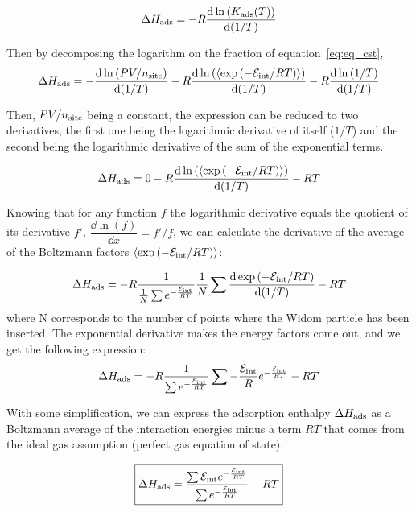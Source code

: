 \documentclass[main.tex]{subfiles}
\begin{document}
\begin{equation}
  \Delta H_{\text{ads}} = -R\dfrac{\mathop{}\mathopen{}\mathrm{d} \ln\left(K_{\text{ads}}(T)\right)}{\mathop{}\mathopen{}\mathrm{d} (1/T)}
\end{equation}

Then by decomposing the logarithm on the fraction of equation~\ref{eq:eq_cst}, 
\begin{equation}
  \Delta H_{\text{ads}} = -\dfrac{\mathop{}\mathopen{}\mathrm{d} \ln\left(PV/n_{\text{site}}\right)}{\mathop{}\mathopen{}\mathrm{d} (1/T)} - R\dfrac{\mathop{}\mathopen{}\mathrm{d} \ln\left(\langle \exp\left(-\mathcal{E}_{\text{int}}/RT\right) \rangle\right)}{\mathop{}\mathopen{}\mathrm{d} (1/T)} - R\dfrac{\mathop{}\mathopen{}\mathrm{d} \ln\left(1/T\right)}{\mathop{}\mathopen{}\mathrm{d} (1/T)}
\end{equation}

Then, $PV/n_{\text{site}}$ being a constant, the expression can be reduced to two derivatives, the first one being the logarithmic derivative of itself ($1/T$) and the second being the logarithmic derivative of the sum of the exponential terms. 

\begin{equation}
  \Delta H_{\text{ads}} = 0 - R\dfrac{\mathop{}\mathopen{}\mathrm{d} \ln\left(\langle \exp\left(-\mathcal{E}_{\text{int}}/RT\right) \rangle\right)}{\mathop{}\mathopen{}\mathrm{d} (1/T)} - RT
\end{equation}

Knowing that for any function $f$ the logarithmic derivative equals the quotient of its derivative $f'$, $\dfrac{\dd \ln\left(f\right)}{\dd x}=f'/f$, we can calculate the derivative of the average of the Boltzmann factors $\langle \exp\left(-\mathcal{E}_{\text{int}}/RT\right) \rangle$:

\begin{equation}
  \Delta H_{\text{ads}} = -R\dfrac{1}{\frac{1}{N}\sum e^{-\frac{\mathcal{E}_{\text{int}}}{RT}}} \frac{1}{N}\sum \dfrac{\mathop{}\mathopen{}\mathrm{d} \exp\left(-\mathcal{E}_{\text{int}}/RT\right)}{\mathop{}\mathopen{}\mathrm{d} (1/T)} - RT
\end{equation}
where N corresponds to the number of points where the Widom particle has been inserted.
The exponential derivative makes the energy factors come out, and we get the following expression:
\begin{equation}
  \Delta H_{\text{ads}} = -R\dfrac{1}{\sum e^{-\frac{\mathcal{E}_{\text{int}}}{RT}}} \sum - \frac{\mathcal{E}_{\text{int}}}{R} e^{-\frac{\mathcal{E}_{\text{int}}}{RT}} - RT
\end{equation}

With some simplification, we can express the adsorption enthalpy $\Delta H_{\text{ads}}$ as a Boltzmann average of the interaction energies minus a term $RT$ that comes from the ideal gas assumption (perfect gas equation of state).

\begin{equation}\label{eq:ads_enthalpy}
  \boxed{
  \Delta H_{\text{ads}} = \dfrac{\sum \mathcal{E}_{\text{int}}e^{-\frac{\mathcal{E}_{\text{int}}}{RT}}}{\sum e^{-\frac{\mathcal{E}_{\text{int}}}{RT}}} - RT
  }
\end{equation}
\end{document}
